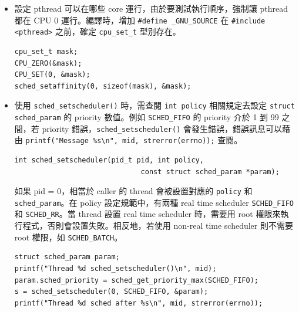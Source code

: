 \documentclass{res}
\begin{document}
\begin{resume}
\vspace*{.1in} 

\hspace*{.1in} 

\begin{itemize}

\item 設定 pthread 可以在哪些 core 運行，由於要測試執行順序，強制讓 pthread 都在 CPU 0 運行。編譯時，增加 \lstinline{#define _GNU_SOURCE} 在 \lstinline{#include <pthread>} 之前，確定 \lstinline{cpu_set_t} 型別存在。
\begin{lstlisting}[frame=single]
cpu_set_t mask;
CPU_ZERO(&mask);
CPU_SET(0, &mask);
sched_setaffinity(0, sizeof(mask), &mask);
\end{lstlisting}

\item 使用 \lstinline{sched_setscheduler()} 時，需查閱 \lstinline{int policy} 相關規定去設定 \lstinline{struct sched_param} 的 priority 數值。例如 \lstinline{SCHED_FIFO} 的 priority 介於 1 到 99 之間，若 priority 錯誤，\lstinline{sched_setscheduler()} 會發生錯誤，錯誤訊息可以藉由 \lstinline{printf("Message %s\n", mid, strerror(errno));} 查閱。

\begin{lstlisting}[frame=single]
int sched_setscheduler(pid_t pid, int policy,
                              const struct sched_param *param);
\end{lstlisting}

如果 pid = 0，相當於 caller 的 thread 會被設置對應的 \lstinline{policy} 和 \lstinline{sched_param}。在 policy 設定規範中，有兩種 real time scheduler \lstinline{SCHED_FIFO} 和 \lstinline{SCHED_RR}。當 thread 設置 real time scheduler 時，需要用 root 權限來執行程式，否則會設置失敗。相反地，若使用 non-real time scheduler 則不需要 root 權限，如 \lstinline{SCHED_BATCH}。


\begin{lstlisting}[frame=single]
struct sched_param param;
printf("Thread %d sched_setscheduler()\n", mid);
param.sched_priority = sched_get_priority_max(SCHED_FIFO);
s = sched_setscheduler(0, SCHED_FIFO, &param);
printf("Thread %d sched after %s\n", mid, strerror(errno));
\end{lstlisting}

\end{itemize}

\hspace*{.1in} 


\end{resume}
\end{document}
